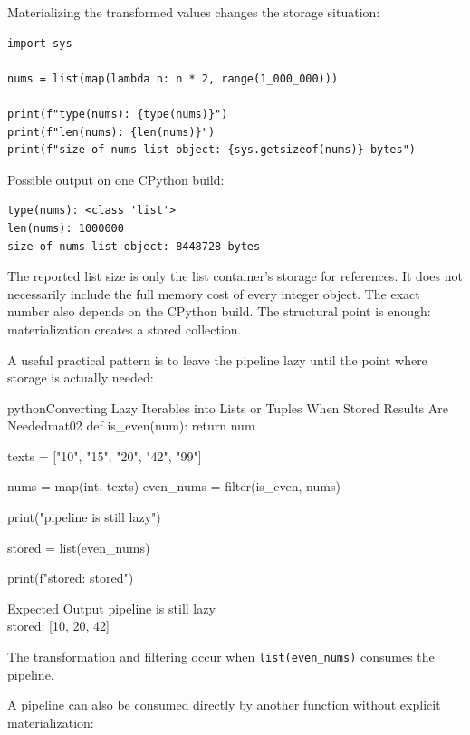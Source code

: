\documentclass[a4paper,twoside]{report}
\begin{document}
Materializing the transformed values changes the storage situation:

\begin{verbatim}
import sys

nums = list(map(lambda n: n * 2, range(1_000_000)))

print(f"type(nums): {type(nums)}")
print(f"len(nums): {len(nums)}")
print(f"size of nums list object: {sys.getsizeof(nums)} bytes")
\end{verbatim}

Possible output on one CPython build:

\begin{verbatim}
type(nums): <class 'list'>
len(nums): 1000000
size of nums list object: 8448728 bytes
\end{verbatim}

The reported list size is only the list container's storage for references. It does not necessarily include the full memory cost of every integer object. The exact number also depends on the CPython build. The structural point is enough: materialization creates a stored collection.

A useful practical pattern is to leave the pipeline lazy until the point where storage is actually needed:

\begin{codebox}[]{python}{Converting Lazy Iterables into Lists or Tuples When Stored Results Are Needed}{mat02}
def is_even(num):
    return num %

texts = ["10", "15", "20", "42", "99"]

nums = map(int, texts)
even_nums = filter(is_even, nums)

print("pipeline is still lazy")

stored = list(even_nums)

print(f"stored: {stored}")
\end{codebox}


\begin{iobox}{Expected Output}
pipeline is still lazy \\
stored: [10, 20, 42] \\
\end{iobox}




The transformation and filtering occur when \texttt{list(even\_nums)} consumes the pipeline.

A pipeline can also be consumed directly by another function without explicit materialization:
\end{document}
